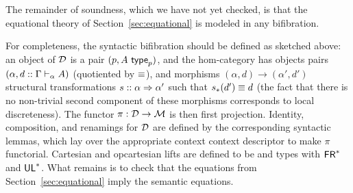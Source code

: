 The remainder of soundness, which we have not yet checked, is that the
equational theory of Section~\ref{sec:equational} is modeled in any
bifibration.

For completeness, the syntactic bifibration should be defined as
sketched above: an object of $\mathcal{D}$ is a pair $(p,A \,\, \mathsf{type}_{p})$, and
the hom-category has objects pairs $(\alpha,d ::
\Gamma \vdash_{\alpha} A)$ (quotiented by $\equiv$), and morphisms
$(\alpha,d) \to (\alpha',d')$ structural transformations $s :: \alpha
\Rightarrow \alpha'$ such that $s_*(d') \equiv d$ (the fact that there is no
non-trivial second component of these morphisms corresponds to local
discreteness).  The functor $\pi : \mathcal{D} \to \mathcal{M}$ is then first projection.
Identity, composition, and renamings for $\mathcal{D}$ are defined by the
corresponding syntactic lemmas, which lay over the appropriate context
context descriptor to make $\pi$ functorial.  Cartesian and opcartesian
lifts are defined to be \Fsymb{} and \Usymb{} types with $\mathsf{FR}^*$ and
$\mathsf{UL}^*$.  What remains is to check that the equations from
Section~\ref{sec:equational} imply the semantic equations.


